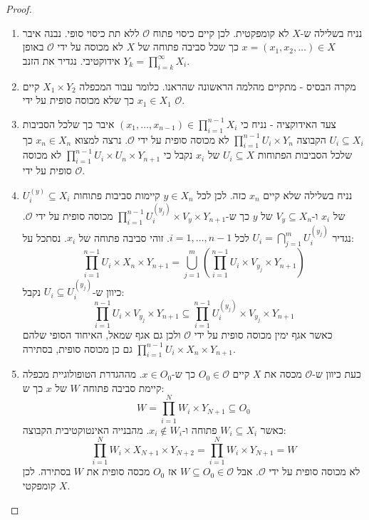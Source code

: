 \documentclass{tstextbook}
\begin{document}
\begin{proof}
  \begin{enumerate}
    \item נניח בשלילה ש-\(X\) לא קומפקטית. לכן קיים כיסוי פתוח \(\mathcal{O}\) ללא תת כיסוי סופי. נבנה איבר \(x=\left( x_{1},x_{2},\dots \right)\in X\) כך שכל סביבה פתוחה של \(X\) לא מכוסה על ידי \(\mathcal{O}\) באופן אידוקטיבי. נגדיר את הזנב \(Y_{k}=\prod_{i=k}^{\infty}X_{i}\).  


    \item מקרה הבסיס - מתקיים מהלמה הראשונה שהראנו. כלומר עבור המכפלה \(X_{1}\times Y_{2}\) קיים \(x_{1} \in X_{1}\) כך שלא מכוסה סופית על ידי \(\mathcal{O}\). 


    \item צעד האידוקציה - נניח כי \(\left( x_{1},\dots,x_{n-1} \right)\in \prod_{i=1}^{n-1}X_{i}\) איבר כך שלכל הסביבות \(U_{i}\subseteq X_{i}\) הקבוצה \(\prod_{i=1}^{n-1}U_{i}\times Y_{n}\) לא מכוסה סופית על ידי \(\mathcal{O}\). נרצה למצוא \(x_{n}\in X_{n}\) כך שלכל הסביבות הפתוחות \(U_{i}\subseteq X\) של \(x_{i}\) נקבל כי \(\prod_{i=1}^{n-1}U_{i}\times U_{n}\times Y_{n+1}\) לא מכוסה סופית על ידי \(\mathcal{O}\).  


    \item נניח בשלילה שלא קיים \(x_{n}\) כזה. לכן לכל \(y\in X_{n}\) קיימות סביבות פתוחות \(U_{i}^{(y)}\subseteq X_{i}\) של \(x_{i}\) ו-\(V_{y}\subseteq X_{n}\) של \(y\) כך ש-\(\prod_{i=1}^{n-1}U_{i}^{(y_{j})}\times V_{y}\times Y_{n+1}\) מכוסה סופית על ידי \(\mathcal{O}\). נגדיר \(U_{i}=\bigcap_{j=1}^{m}U_{i}^{(y_{j})}\) לכל \(i=1,\dots,n-1\). זוהי סביבה פתוחה של \(x_{i}\). נסתכל על: 
$$\prod_{i=1}^{n-1}U_{i}\times X_{n}\times Y_{n+1}=\bigcup_{j=1}^{m}\left(\prod_{i=1}^{n-1}U_{i}\times V_{y_{j}}\times Y_{n+1}\right)$$
כיוון ש-\(U_{i}\subseteq U_{i}^{(y_{j})}\) נקבל:
$$\prod_{i=1}^{n-1}U_{i}\times V_{y_{j}}\times Y_{n+1}\subseteq\prod_{i=1}^{n-1}U_{i}^{(y_{j})}\times V_{y_{j}}\times Y_{n+1}$$
כאשר אגף ימין מכוסה סופית על ידי \(\mathcal{O}\) ולכן גם אגף שמאל, האיחוד הסופי שלהם \(\textstyle\prod_{i=1}^{n-1}U_{i}\times X_{n}\times Y_{n+1}\) גם כן מכוסה סופית, בסתירה.


    \item כעת כיוון ש-\(\mathcal{O}\) מכסה את \(X\) קיים \(O_0 \in \mathcal{O}\) כך ש-\(x \in O_{0}\). מההגדרת הטופולוגיית מכפלה קיימת סביבה פתוחה \(W\) של \(x\) כך ש: 
$$W=\prod_{i=1}^{N}W_{i}\times Y_{N+1}\subseteq{ O}_{0}$$
כאשר \(W_{i}\subseteq X_{i}\) פתוחה ו-\(x_{i}\not \in W_{i}\). מהבנייה האינטוקטיבית הקבוצה:
$$\prod_{i=1}^{N}W_{i}\times X_{N+1}\times Y_{N+2}=\prod_{i=1}^{N}W_{i}\times Y_{N+1}=W$$
לא מכוסה סופית על ידי \(\mathcal{O}\). אבל \(W\subseteq O_{0}\in \mathcal{O}\) אז \(O_{0}\) מכסה סופית את \(W\) בסתירה. לכן \(X\) קומפקטי.


  \end{enumerate}
\end{proof}
\end{document}
